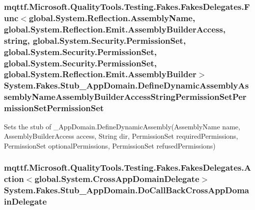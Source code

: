 \hypertarget{class_system_1_1_fakes_1_1_stub___app_domain_a2a57401d2cd459de6d48cda72f94b6fc}{
\subsubsection[{Define\-Dynamic\-Assembly\-Assembly\-Name\-Assembly\-Builder\-Access\-String\-Permission\-Set\-Permission\-Set\-Permission\-Set}]{\setlength{\rightskip}{0pt plus 5cm}mqttf.\-Microsoft.\-Quality\-Tools.\-Testing.\-Fakes.\-Fakes\-Delegates.\-Func$<$global.\-System.\-Reflection.\-Assembly\-Name, global.\-System.\-Reflection.\-Emit.\-Assembly\-Builder\-Access, string, global.\-System.\-Security.\-Permission\-Set, global.\-System.\-Security.\-Permission\-Set, global.\-System.\-Security.\-Permission\-Set, global.\-System.\-Reflection.\-Emit.\-Assembly\-Builder$>$ System.\-Fakes.\-Stub\-\_\-\-App\-Domain.\-Define\-Dynamic\-Assembly\-Assembly\-Name\-Assembly\-Builder\-Access\-String\-Permission\-Set\-Permission\-Set\-Permission\-Set}}\label{class_system_1_1_fakes_1_1_stub___app_domain_a2a57401d2cd459de6d48cda72f94b6fc}


Sets the stub of \-\_\-\-App\-Domain.\-Define\-Dynamic\-Assembly(\-Assembly\-Name name, Assembly\-Builder\-Access access, String dir, Permission\-Set required\-Permissions, Permission\-Set optional\-Permissions, Permission\-Set refused\-Permissions)

\hypertarget{class_system_1_1_fakes_1_1_stub___app_domain_a8432ac505abb2770b673e607cf871468}{
\subsubsection[{Do\-Call\-Back\-Cross\-App\-Domain\-Delegate}]{\setlength{\rightskip}{0pt plus 5cm}mqttf.\-Microsoft.\-Quality\-Tools.\-Testing.\-Fakes.\-Fakes\-Delegates.\-Action$<$global.\-System.\-Cross\-App\-Domain\-Delegate$>$ System.\-Fakes.\-Stub\-\_\-\-App\-Domain.\-Do\-Call\-Back\-Cross\-App\-Domain\-Delegate}}\label{class_system_1_1_fakes_1_1_stub___app_domain_a8432ac505abb2770b673e607cf871468}


